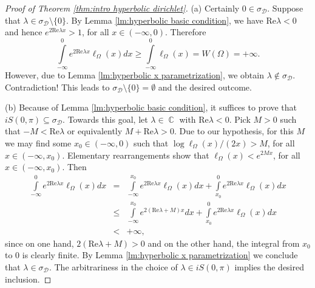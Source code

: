 \documentclass[10pt,a4paper]{amsart}
\DeclareMathOperator{\C}{\mathbb{C}}
\begin{document}
	\begin{proof}[Proof of Theorem \ref{thm:intro hyperbolic dirichlet}]
		(a) Certainly $0\in\sigma_{\mathcal{D}}$. Suppose that $\lambda\in\sigma_{\mathcal{D}}\setminus\{0\}$. By Lemma \ref{lm:hyperbolic basic condition}, we have $\mathrm{Re}\lambda<0$ and hence $e^{2\mathrm{Re}\lambda x}>1$, for all $x\in(-\infty,0)$. Therefore
		$$\int\limits_{-\infty}^{0}e^{2\mathrm{Re}\lambda x}\ell_\Omega(x)dx\ge\int\limits_{-\infty}^{0}\ell_\Omega(x)=W(\Omega)=+\infty.$$
		However, due to Lemma \ref{lm:hyperbolic x parametrization}, we obtain $\lambda\notin\sigma_{\mathcal{D}}$. Contradiction! This leads to $\sigma_{\mathcal{D}}\setminus\{0\}=\emptyset$ and the desired outcome.
		
		(b) Because of Lemma \ref{lm:hyperbolic basic condition}, it suffices to prove that $iS(0,\pi)\subseteq\sigma_{\mathcal{D}}$. Towards this goal, let $\lambda\in\C$ with $\mathrm{Re}\lambda<0$. Pick $M>0$ such that $-M<\mathrm{Re}\lambda$ or equivalently $M+\mathrm{Re}\lambda>0$. Due to our hypothesis, for this $M$ we may find some $x_0\in(-\infty,0)$ such that $\log\ell_\Omega(x)/(2x)>M$, for all $x\in(-\infty,x_0)$. Elementary rearrangements show that $\ell_\Omega(x)<e^{2Mx}$, for all $x\in(-\infty,x_0)$. Then
		\begin{eqnarray*}
			\int\limits_{-\infty}^{0}e^{2\mathrm{Re}\lambda x}\ell_\Omega(x)dx &=& \int\limits_{-\infty}^{x_0}e^{2\mathrm{Re}\lambda x}\ell_\Omega(x)dx+\int\limits_{x_0}^{0}e^{2\mathrm{Re}\lambda x}\ell_\Omega(x)dx \\
			&\le&\int\limits_{-\infty}^{x_0}e^{2(\mathrm{Re}\lambda+M)x}dx+\int\limits_{x_0}^{0}e^{2\mathrm{Re}\lambda x}\ell_\Omega(x)dx\\
			&<&+\infty,
		\end{eqnarray*}
		since on one hand, $2(\mathrm{Re}\lambda+M)>0$ and on the other hand, the integral from $x_0$ to $0$ is clearly finite. By Lemma \ref{lm:hyperbolic x parametrization} we conclude that $\lambda\in\sigma_{\mathcal{D}}$. The arbitrariness in the choice of $\lambda\in iS(0,\pi)$ implies the desired inclusion.
		

\end{proof}
\end{document}
